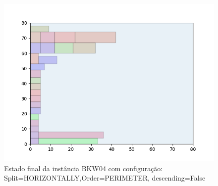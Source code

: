 \begin{figure}[H]
    \centering
    \caption[]{Estado final da instância BKW04 com configuração: Split=HORIZONTALLY,Order=PERIMETER, descending=False}
    \label{fig:bkw04-horizontally-perimeter-false}
    \includegraphics[scale=0.5]{output/figures/bkw/bkw04/horizontally/perimeter/false/00}
\end{figure}